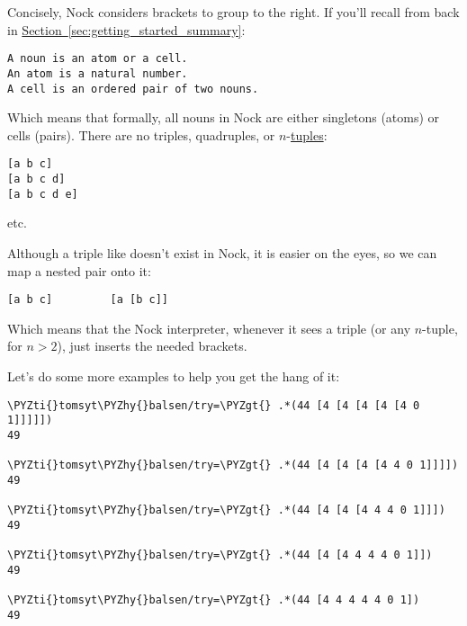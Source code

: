 Concisely, Nock considers brackets to group to the right. If you'll recall from back in \hyperref[sec:getting_started_summary]{Section~\ref{sec:getting_started_summary}}:
\begin{framed_shaded}
\begin{Verbatim}[fontsize=\relsize{-2.5},commandchars=\\\{\}]
A noun is an atom or a cell.
An atom is a natural number.
A cell is an ordered pair of two nouns.
\end{Verbatim}
\end{framed_shaded}
Which means that formally, all nouns in Nock are either singletons (atoms) or
cells (pairs). There are no triples, quadruples, or \(n\)-\href{https://en.wikipedia.org/wiki/Tuple}{tuples}:
\begin{framed_shaded}
\begin{Verbatim}[fontsize=\relsize{-2.5},commandchars=\\\{\}]
[a b c]
[a b c d]
[a b c d e]
\end{Verbatim}
\end{framed_shaded}
etc.

Although a triple like \kode{[a b c]} doesn't exist in Nock, it is easier on the
eyes, so we can map a nested pair onto it:
\begin{framed_shaded}
\begin{Verbatim}[fontsize=\relsize{-2.5},commandchars=\\\{\}]
[a b c]         [a [b c]]
\end{Verbatim}
\end{framed_shaded}
Which means that the Nock interpreter, whenever it sees a triple (or any
\(n\)-tuple, for \(n>2\)), just inserts the needed brackets.

Let's do some more examples to help you get the hang of it:
\begin{framed_shaded}
\begin{Verbatim}[fontsize=\relsize{-2.5},commandchars=\\\{\}]
\PYZti{}tomsyt\PYZhy{}balsen/try=\PYZgt{} .*(44 [4 [4 [4 [4 [4 0 1]]]]])
49

\PYZti{}tomsyt\PYZhy{}balsen/try=\PYZgt{} .*(44 [4 [4 [4 [4 4 0 1]]]])
49

\PYZti{}tomsyt\PYZhy{}balsen/try=\PYZgt{} .*(44 [4 [4 [4 4 4 0 1]]])
49

\PYZti{}tomsyt\PYZhy{}balsen/try=\PYZgt{} .*(44 [4 [4 4 4 4 0 1]])
49

\PYZti{}tomsyt\PYZhy{}balsen/try=\PYZgt{} .*(44 [4 4 4 4 4 0 1])
49
\end{Verbatim}
\end{framed_shaded}

